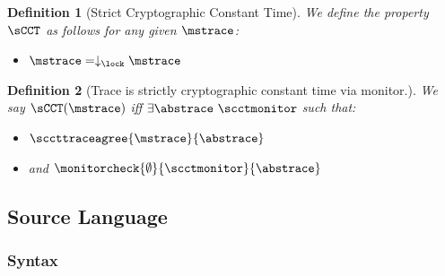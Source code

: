 \documentclass[a4paper,names,dvipsnames]{article}
\newtheorem{definition}{Definition}
\begin{document}
\begin{definition}[Strict Cryptographic Constant Time]\label{def:scct}
  We define the property $\operatorname{\sCCT}$ as follows for any given $\mstrace$:
  \begin{itemize}
    \item $\mstrace=\downarrow_{\lock}\mstrace$
  \end{itemize}
\end{definition}

\begin{definition}[Trace is strictly cryptographic constant time via monitor.]\label{def:src:trace:scct}
  We say $\texttt{\sCCT}(\mstrace)$ iff $\exists \abstrace\ \scctmonitor$ such that:
  \begin{itemize}
    \item $\sccttraceagree{\mstrace}{\abstrace}$
    \item and $\monitorcheck{\emptyset}{\scctmonitor}{\abstrace}$
  \end{itemize}
\end{definition}

\subsection{Source Language}
\subsubsection{Syntax}
\end{document}
